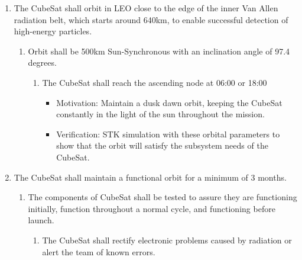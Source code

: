 \begin{enumerate}
\begin{enumerate}
\begin{enumerate}
\begin{itemize}
                    \item Verification: 
                \end{itemize}
                \item The EoL system will be capable of activation in the event of a DoA scenario. 
                    \begin{itemize}
                        \item Motivation:
                        \item Verification: 
                    \end{itemize}
         \end{enumerate}
    \end{enumerate} %
    \item The CubeSat shall orbit in LEO close to the edge of the inner Van Allen radiation belt, which starts around 640km, to enable successful detection of high-energy particles.  
    \begin{enumerate}
        \item Orbit shall be 500km Sun-Synchronous with an inclination angle of 97.4 degrees.
        \begin{enumerate}
            \item The CubeSat shall reach the ascending node at 06:00 or 18:00
                \begin{itemize}
                        \item Motivation: Maintain a dusk dawn orbit, keeping the CubeSat constantly in the light of the sun throughout the mission.
                        \item Verification: STK simulation with these orbital parameters to show that the orbit will satisfy the subsystem needs of the CubeSat. 
                    \end{itemize}
        \end{enumerate}
    \end{enumerate} %
    \item The CubeSat shall maintain a functional orbit for a minimum of 3 months.
        \begin{enumerate}
            \item The components of CubeSat shall be tested to assure they are functioning initially, function throughout a normal cycle, and functioning before launch. 
                \begin{enumerate}
                    \item The CubeSat shall rectify electronic problems caused by radiation or alert the team of known errors. 

\end{enumerate}
\end{enumerate}
\end{enumerate}
